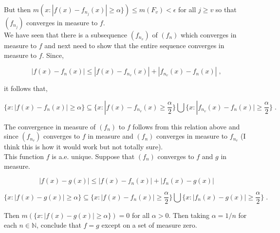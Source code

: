 \documentclass[a4paper]{article}
\begin{document}
But then $m\left(x : |f(x) - f_{n_j}(x)| \geq \alpha\} \right) \leq m(F_v) < \epsilon$ for all $j \geq v$ so that $(f_{n_j})$ converges in measure to $f$. \\

We have seen that there is a subsequence $(f_{n_v})$ of $(f_n)$ which converges in measure to $f$ and next need to show that the entire sequence converges in measure to $f$. Since,

$$|f(x) - f_n(x)| \leq |f(x) - f_{n_v}(x)| + |f_{n_v}(x) - f_n(x)| \; ,$$

it follows that,

$$\{x : |f(x) - f_n(x)| \geq \alpha \} \subseteq \{x : |f(x) - f_{n_v}(x) \geq \frac{\alpha}{2} \} \bigcup \{x : |f_{n_v}(x) - f_n(x)| \geq \frac{\alpha}{2} \} \;.$$

The convergence in measure of $(f_n)$ to $f$ follows from this relation above and since $(f_{n_v})$ converges to $f$ in measure and $(f_{n})$ converges in measure to $f_{n_v}$ (I think this is how it would work but not totally sure).\\

 This function $f$ is a.e. unique. Suppose that $(f_n)$ converges to $f$ and $g$ in measure.
 
 $$|f(x) - g(x)| \leq |f(x) - f_n(x)| + |f_n(x) - g(x)|$$

$$\{x : |f(x) - g(x)| \geq \alpha \} \subseteq \{x : |f(x) - f_n(x)| \geq \frac{\alpha}{2}\} \bigcup \{x : |f_n(x) - g(x)| \geq \frac{\alpha}{2} \} \;.$$

Then $m(\{x : |f(x) - g(x)| \geq \alpha \}) = 0$ for all $\alpha > 0$. Then taking $\alpha = 1/n$ for each $n \in \mathbb{N}$, conclude that $f=g$ except on a set of measure zero. 
\end{document}
